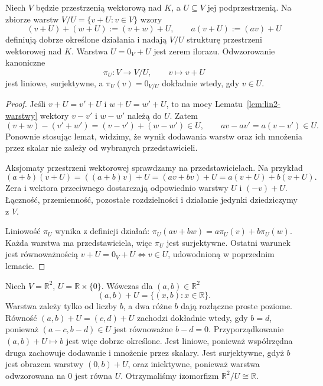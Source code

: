 \begin{twierdzenie}
\label{thm:lin2-struktura-ilorazu}
Niech \(V\) będzie przestrzenią wektorową nad \(K\),
a \(U\subseteq V\) jej podprzestrzenią.
Na zbiorze warstw \(V/U=\{v+U:v\in V\}\) wzory
\[
 (v+U)+(w+U):=(v+w)+U,\qquad
 a(v+U):=(av)+U
\]
definiują dobrze określone działania
i nadają \(V/U\) strukturę przestrzeni
wektorowej nad \(K\).
Warstwa \(U=0_V+U\) jest zerem ilorazu.
Odwzorowanie kanoniczne
\[
 \pi_U\colon V\longrightarrow V/U,\qquad
 v\longmapsto v+U
\]
jest liniowe, surjektywne, a
\(\pi_U(v)=0_{V/U}\) dokładnie wtedy, gdy \(v\in U\).
\end{twierdzenie}
\begin{proof}
Jeśli \(v+U=v'+U\) i \(w+U=w'+U\),
to na mocy Lematu~\ref{lem:lin2-warstwy}
wektory \(v-v'\) i \(w-w'\) należą do \(U\).
Zatem
\[
 (v+w)-(v'+w')=(v-v')+(w-w')\in U,
 \qquad av-av'=a(v-v')\in U.
\]
Ponownie stosując lemat, widzimy,
że wynik dodawania warstw oraz ich
mnożenia przez skalar nie zależy
od wybranych przedstawicieli.

Aksjomaty przestrzeni wektorowej
sprawdzamy na przedstawicielach.
Na przykład
\[
 (a+b)(v+U)=((a+b)v)+U
 =(av+bv)+U=a(v+U)+b(v+U).
\]
Zera i wektora przeciwnego dostarczają
odpowiednio warstwy \(U\) i \((-v)+U\).
Łączność, przemienność, pozostałe
rozdzielności i działanie jedynki
dziedziczymy z \(V\).

Liniowość \(\pi_U\) wynika z definicji działań:
\(\pi_U(av+bw)=a\pi_U(v)+b\pi_U(w)\).
Każda warstwa ma przedstawiciela,
więc \(\pi_U\) jest surjektywne.
Ostatni warunek jest równoważnością
\(v+U=0_V+U\iff v\in U\),
udowodnioną w poprzednim lemacie.
\end{proof}

\begin{przyklad}
\label{prz:lin2-warstwy-r2}
Niech \(V=\mathbb R^2\),
\(U=\mathbb R\times\{0\}\).
Wówczas dla \((a,b)\in\mathbb R^2\)
\[
 (a,b)+U=\{(x,b):x\in\mathbb R\}.
\]
Warstwa zależy tylko od liczby \(b\),
a dwa różne \(b\) dają rozłączne
proste poziome.
Równość \((a,b)+U=(c,d)+U\)
zachodzi dokładnie wtedy, gdy \(b=d\),
ponieważ \((a-c,b-d)\in U\) jest równoważne
\(b-d=0\).
Przyporządkowanie \((a,b)+U\mapsto b\)
jest więc dobrze określone.
Jest liniowe, ponieważ współrzędna
druga zachowuje dodawanie i mnożenie
przez skalary. Jest surjektywne, gdyż
\(b\) jest obrazem warstwy \((0,b)+U\),
oraz iniektywne, ponieważ warstwa
odwzorowana na \(0\) jest równa \(U\).
Otrzymaliśmy izomorfizm
\(\mathbb R^2/U\cong\mathbb R\).
\end{przyklad}

